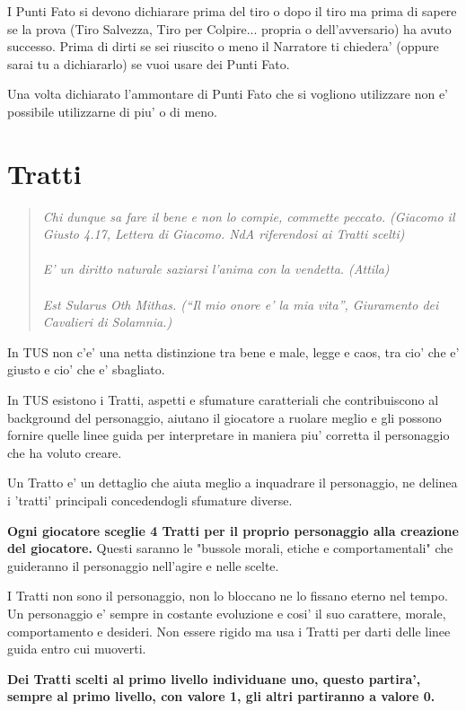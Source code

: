 \documentclass[a4paper,11pt,twoside,openany]{book}
\begin{document}
I Punti Fato si devono dichiarare prima del tiro o dopo il tiro ma prima di sapere se la prova (Tiro Salvezza, Tiro per Colpire... propria o dell’avversario) ha avuto successo. 
Prima di dirti se sei riuscito o meno il Narratore ti chiedera’ (oppure sarai tu a dichiararlo) se vuoi usare dei Punti Fato.

Una volta dichiarato l’ammontare di Punti Fato che si vogliono utilizzare non e’ possibile utilizzarne di piu' o di meno.

\section{Tratti}

\label{tratti}
\begin{quote}\textit{
Chi dunque sa fare il bene e non lo compie, commette peccato. (Giacomo il Giusto 4.17, Lettera di Giacomo. NdA riferendosi ai Tratti scelti)\\\\
E' un diritto naturale saziarsi l'anima con la vendetta. (Attila)\\\\
Est Sularus Oth Mithas. (“Il mio onore e' la mia vita”, Giuramento dei Cavalieri di Solamnia.)}\end{quote}

In TUS non c'e' una netta distinzione tra bene e male, legge e caos, tra cio' che e' giusto e cio' che e' sbagliato.

In TUS esistono i Tratti, aspetti e sfumature caratteriali che contribuiscono al background del personaggio, aiutano il giocatore a ruolare meglio e gli possono fornire quelle linee guida per interpretare in maniera piu' corretta il personaggio che ha voluto creare.

Un Tratto e' un dettaglio che aiuta meglio a inquadrare il personaggio, ne delinea i 'tratti' principali concedendogli sfumature diverse.

\textbf{Ogni giocatore sceglie 4 Tratti per il proprio personaggio alla creazione del giocatore.} Questi saranno le "bussole morali, etiche e comportamentali" che guideranno il personaggio nell'agire e nelle scelte.

I Tratti non sono il personaggio, non lo bloccano ne lo fissano eterno nel tempo. Un personaggio e' sempre in costante evoluzione e cosi' il suo carattere, morale, comportamento e desideri. Non essere rigido ma usa i Tratti per darti delle linee guida entro cui muoverti.

\textbf{Dei Tratti scelti al primo livello individuane uno, questo partira', sempre al primo livello, con valore 1, gli altri partiranno a valore 0.}
\end{document}
